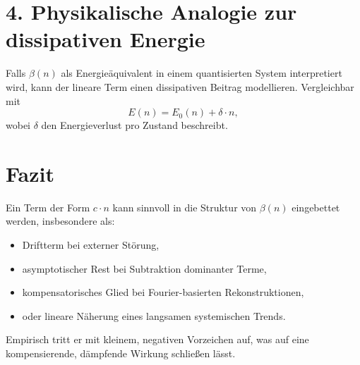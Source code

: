 \documentclass[a4paper,12pt]{article}
\begin{document}
\section*{4. Physikalische Analogie zur dissipativen Energie}

Falls \(\beta(n)\) als Energieäquivalent in einem quantisierten System interpretiert wird, kann der lineare Term einen dissipativen Beitrag modellieren. Vergleichbar mit
\[
E(n) = E_0(n) + \delta \cdot n,
\]
wobei \(\delta\) den Energieverlust pro Zustand beschreibt.

\section*{Fazit}

Ein Term der Form \(c \cdot n\) kann sinnvoll in die Struktur von \(\beta(n)\) eingebettet werden, insbesondere als:
\begin{itemize}
    \item Driftterm bei externer Störung,
    \item asymptotischer Rest bei Subtraktion dominanter Terme,
    \item kompensatorisches Glied bei Fourier-basierten Rekonstruktionen,
    \item oder lineare Näherung eines langsamen systemischen Trends.
\end{itemize}
Empirisch tritt er mit kleinem, negativen Vorzeichen auf, was auf eine kompensierende, dämpfende Wirkung schließen lässt.
\end{document}
